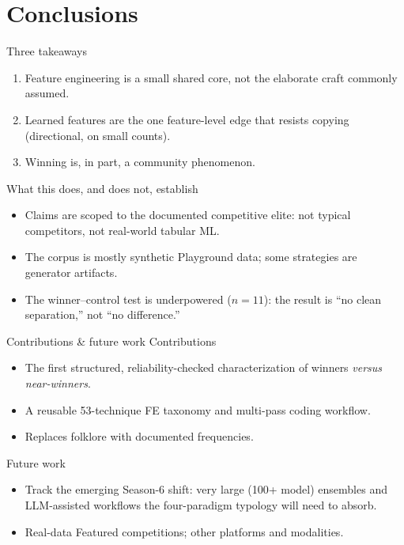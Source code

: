 \documentclass[aspectratio=169,11pt]{beamer}
\begin{document}
\section{Conclusions}

\begin{frame}{Three takeaways}
  \begin{enumerate}
    \item Feature engineering is a \alert{small shared core}, not the elaborate
          craft commonly assumed.
    \item \alert{Learned features} are the one feature-level edge that resists
          copying (directional, on small counts).
    \item Winning is, in part, a \alert{community phenomenon}.
  \end{enumerate}
\end{frame}

\begin{frame}{What this does, and does not, establish}
  \begin{itemize}
    \item Claims are scoped to the \alert{documented competitive elite}: not typical
          competitors, not real-world tabular ML.
    \item The corpus is mostly \alert{synthetic} Playground data; some strategies
          are generator artifacts.
    \item The winner--control test is \alert{underpowered} ($n=11$): the result is
          ``no clean separation,'' not ``no difference.''
  \end{itemize}
\end{frame}

\begin{frame}{Contributions \& future work}
  \alert{Contributions}
  \begin{itemize}
    \item The first structured, reliability-checked characterization of winners
          \emph{versus near-winners}.
    \item A reusable 53-technique FE taxonomy and multi-pass coding workflow.
    \item Replaces folklore with documented frequencies.
  \end{itemize}
  \vspace{0.4em}
  \alert{Future work}
  \begin{itemize}
    \item Track the emerging \alert{Season-6 shift}: very large (100+ model) ensembles
          and LLM-assisted workflows the four-paradigm typology will need to absorb.
    \item Real-data Featured competitions; other platforms and modalities.
  \end{itemize}
\end{frame}
\end{document}
